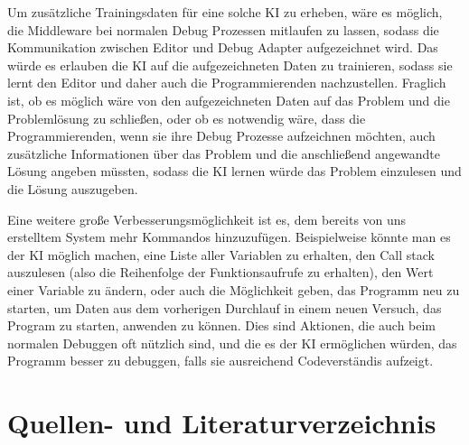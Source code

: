 \documentclass[a4paper,12pt,ngerman]{scrartcl}
\begin{document}
Um zusätzliche Trainingsdaten für eine solche KI zu erheben, wäre es möglich, die Middleware bei normalen Debug Prozessen mitlaufen zu lassen, sodass die Kommunikation zwischen Editor und Debug Adapter aufgezeichnet wird. Das würde es erlauben die KI auf die aufgezeichneten Daten zu trainieren, sodass sie lernt den Editor und daher auch die Programmierenden nachzustellen. Fraglich ist, ob es möglich wäre von den aufgezeichneten Daten auf das Problem und die Problemlösung zu schließen, oder ob es notwendig wäre, dass die Programmierenden, wenn sie ihre Debug Prozesse aufzeichnen möchten, auch zusätzliche Informationen über das Problem und die anschließend angewandte Lösung angeben müssten, sodass die KI lernen würde das Problem einzulesen und die Lösung auszugeben.

Eine weitere große Verbesserungsmöglichkeit ist es, dem bereits von uns erstelltem System mehr Kommandos hinzuzufügen. Beispielweise könnte man es der KI möglich machen, eine Liste aller Variablen zu erhalten, den Call stack auszulesen (also die Reihenfolge der Funktionsaufrufe zu erhalten), den Wert einer Variable zu ändern, oder auch die Möglichkeit geben, das Programm neu zu starten, um Daten aus dem vorherigen Durchlauf in einem neuen Versuch, das Program zu starten, anwenden zu können. Dies sind Aktionen, die auch beim normalen Debuggen oft nützlich sind, und die es der KI ermöglichen würden, das Programm besser zu debuggen, falls sie ausreichend Codeverständis aufzeigt.

\section{Quellen- und Literaturverzeichnis}
\end{document}
